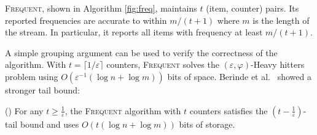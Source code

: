 \documentclass[sigconf,review=true,anonymous=true,screen]{acmart}
\newcommand{\ignore}[1]{}
\newcommand{\eps}{\varepsilon}
\renewcommand{\phi}{\varphi}
\begin{document}
    \vspace*{.5cm}
\textsc{Frequent}, shown in Algorithm \ref{fig:freq}, maintains $t$ (item, counter) pairs. Its reported frequencies are accurate to within $m/(t+1)$ where $m$ is the length of the stream. In particular, it reports all items with frequency at least $m/(t+1)$. 

\ignore{In the algorithm, each new item is compared with stored items and if the new item is among the stored items, then the count value of stored items is incremented. Else, if it is not the one already present and there is some counter whose value is zero, then this item in the table is stored and the counter value is set to one. Else if all counter value is non-zero, then the counter value is decremented by 1 for each item. }
A simple grouping argument can be used to verify the correctness of the algorithm. With $t = \lceil 1/\eps \rceil$ counters, \textsc{Frequent} solves the $(\eps,\phi)$-Heavy hitters problem using $O(\varepsilon^{-1} (\log n + \log m))$ bits of space. Berinde et al.~\cite{BCIS} showed a stronger tail bound:
\begin{theorem}(\cite{BCIS})\label{thm:tailfreq}
For any $t \geq \frac1\eps$, the \textsc{Frequent} algorithm with $t$ counters satisfies the $\left(t-\frac1\eps\right)$-tail bound and uses $O(t(\log n + \log m))$ bits of storage.
\end{theorem}
\end{document}
